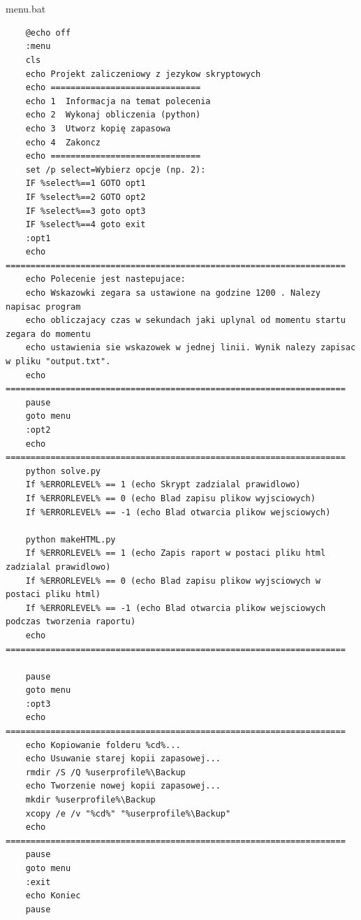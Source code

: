 \documentclass[12pt,a4paper]{article}
\begin{document}
    
    \\\\menu.bat
    \begin{lstlisting}
    @echo off
    :menu
    cls
    echo Projekt zaliczeniowy z jezykow skryptowych
    echo ==============================
    echo 1	Informacja na temat polecenia
    echo 2	Wykonaj obliczenia (python)
    echo 3	Utworz kopię zapasowa
    echo 4	Zakoncz
    echo ==============================
    set /p select=Wybierz opcje (np. 2):
    IF %select%==1 GOTO opt1
    IF %select%==2 GOTO opt2
    IF %select%==3 goto opt3
    IF %select%==4 goto exit
    :opt1
    echo ====================================================================
    echo Polecenie jest nastepujace:
    echo Wskazowki zegara sa ustawione na godzine 1200 . Nalezy napisac program
    echo obliczajacy czas w sekundach jaki uplynal od momentu startu zegara do momentu
    echo ustawienia sie wskazowek w jednej linii. Wynik nalezy zapisac w pliku "output.txt".
    echo ====================================================================
    pause
    goto menu
    :opt2
    echo ====================================================================
    python solve.py
    If %ERRORLEVEL% == 1 (echo Skrypt zadzialal prawidlowo)
    If %ERRORLEVEL% == 0 (echo Blad zapisu plikow wyjsciowych)
    If %ERRORLEVEL% == -1 (echo Blad otwarcia plikow wejsciowych)
    
    python makeHTML.py
    If %ERRORLEVEL% == 1 (echo Zapis raport w postaci pliku html zadzialal prawidlowo)
    If %ERRORLEVEL% == 0 (echo Blad zapisu plikow wyjsciowych w postaci pliku html)
    If %ERRORLEVEL% == -1 (echo Blad otwarcia plikow wejsciowych podczas tworzenia raportu)
    echo ====================================================================
    
    pause
    goto menu
    :opt3
    echo ====================================================================
    echo Kopiowanie folderu %cd%...
    echo Usuwanie starej kopii zapasowej...
    rmdir /S /Q %userprofile%\Backup
    echo Tworzenie nowej kopii zapasowej...
    mkdir %userprofile%\Backup
    xcopy /e /v "%cd%" "%userprofile%\Backup"
    echo ====================================================================
    pause
    goto menu
    :exit
    echo Koniec
    pause
    \end{lstlisting}
    
    
    
\end{document}

